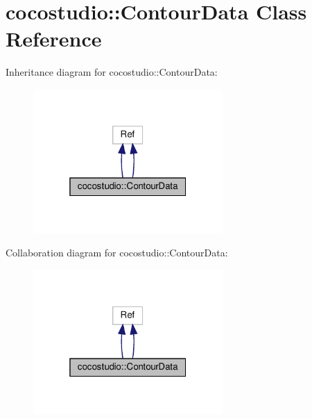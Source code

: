 \hypertarget{classcocostudio_1_1ContourData}{}\section{cocostudio\+:\+:Contour\+Data Class Reference}
\label{classcocostudio_1_1ContourData}


Inheritance diagram for cocostudio\+:\+:Contour\+Data\+:
\nopagebreak
\begin{figure}[H]
\begin{center}
\leavevmode
\includegraphics[width=205pt]{classcocostudio_1_1ContourData__inherit__graph}
\end{center}
\end{figure}


Collaboration diagram for cocostudio\+:\+:Contour\+Data\+:
\nopagebreak
\begin{figure}[H]
\begin{center}
\leavevmode
\includegraphics[width=205pt]{classcocostudio_1_1ContourData__coll__graph}
\end{center}
\end{figure}
